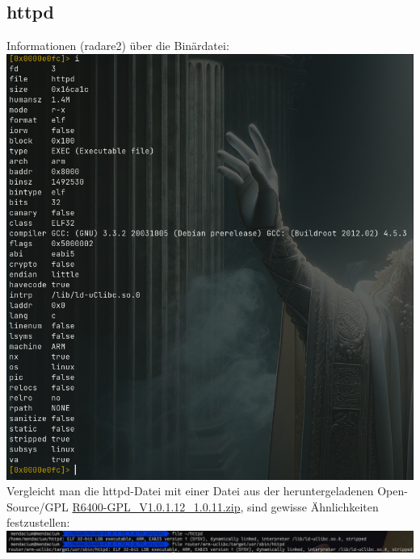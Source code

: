 \documentclass{article}
\begin{document}
	\subsection*{httpd}
	Informationen (radare2) über die Binärdatei:\\
	\includegraphics[width=0.4\linewidth]{"pictures/1.7 architecture, entry point.png"}\\
	Vergleicht man die httpd-Datei mit einer Datei aus der heruntergeladenen Open-Source/GPL \href{https://kb.netgear.com/2649/NETGEAR-Open-Source-Code-for-Programmers-GPL}{R6400-GPL\_V1.0.1.12\_1.0.11.zip}, sind gewisse Ähnlichkeiten festzustellen:\\
	\includegraphics[width=0.7\linewidth]{"pictures/1.8 httpd compare"}
\end{document}
